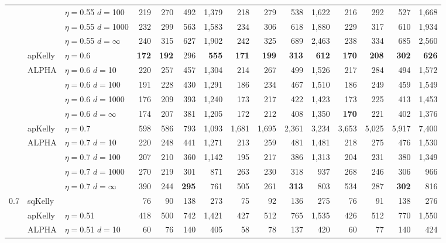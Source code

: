 \documentclass[12pt,runningheads]{llncs}
\begin{document}
{\begin{table}
\begin{tabular}{lll|rrrr|rrrr|rrrr}
&  & $\eta=$0.55 $d=$100 & 219  & 270  & 492  & 1,379  & 218  & 279  & 538  & 1,622  & 216  & 292  & 527  & 1,668  \\
&  & $\eta=$0.55 $d=$1000 & 232  & 299  & 563  & 1,583  & 234  & 306  & 618  & 1,880  & 229  & 317  & 610  & 1,934  \\
 &  & $\eta=$0.55 $d=\infty$ & 240  & 315  & 627  & 1,902  & 242  & 325  & 689  & 2,463  & 238  & 334  & 685  & 2,560  \\
\cline{2-15} & apKelly & $\eta=$0.6 & \bf{172}  & \bf{192}  & 296  & \bf{555}  & \bf{171}  & \bf{199}  & \bf{313}  & \bf{612}  & \bf{170}  & \bf{208}  & \bf{302}  & \bf{626}  \\
\cline{2-15}
& ALPHA & $\eta=$0.6 $d=$10 & 220  & 257  & 457  & 1,304  & 214  & 267  & 499  & 1,526  & 217  & 284  & 494  & 1,572  \\
&  & $\eta=$0.6 $d=$100 & 191  & 228  & 430  & 1,291  & 186  & 234  & 467  & 1,510  & 186  & 249  & 459  & 1,549  \\
&  & $\eta=$0.6 $d=$1000 & 176  & 209  & 393  & 1,240  & 173  & 217  & 422  & 1,423  & 173  & 225  & 413  & 1,453  \\
 &  & $\eta=$0.6 $d=\infty$ & 174  & 207  & 381  & 1,205  & 172  & 212  & 408  & 1,350  & \bf{170}  & 221  & 402  & 1,376  \\
\cline{2-15} & apKelly & $\eta=$0.7 & 598  & 586  & 793  & 1,093  & 1,681  & 1,695  & 2,361  & 3,234  & 3,653  & 5,025  & 5,917  & 7,400  \\
\cline{2-15}
& ALPHA & $\eta=$0.7 $d=$10 & 220  & 248  & 441  & 1,271  & 213  & 259  & 481  & 1,481  & 218  & 275  & 476  & 1,530  \\
&  & $\eta=$0.7 $d=$100 & 207  & 210  & 360  & 1,142  & 195  & 217  & 386  & 1,313  & 204  & 231  & 380  & 1,349  \\
&  & $\eta=$0.7 $d=$1000 & 270  & 219  & 301  & 871  & 263  & 230  & 318  & 937  & 268  & 246  & 306  & 966  \\
 &  & $\eta=$0.7 $d=\infty$ & 390  & 244  & \bf{295}  & 761  & 505  & 261  & \bf{313}  & 803  & 534  & 287  & \bf{302}  & 816  \\
\hline 0.7 & sqKelly & & 76  & 90  & 138  & 273  & 75  & 92  & 136  & 275  & 76  & 91  & 138  & 276  \\
\cline{2-15} & apKelly & $\eta=$0.51 & 418  & 500  & 742  & 1,421  & 427  & 512  & 765  & 1,535  & 426  & 512  & 770  & 1,550  \\
\cline{2-15}
& ALPHA & $\eta=$0.51 $d=$10 & 60  & 76  & 140  & 405  & 58  & 78  & 137  & 420  & 60  & 77  & 140  & 424  \\

\end{tabular}
\end{table}}
\end{document}
